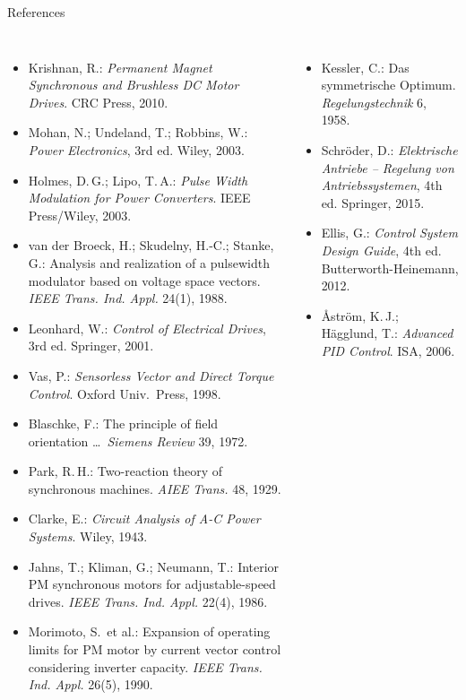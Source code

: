 \documentclass[aspectratio=169,10pt]{beamer}
\begin{document}
\begin{frame}[t]{References}
\fontsize{6}{7}\selectfont\setlength{\itemsep}{0pt}
\begin{columns}[T,onlytextwidth]
\begin{itemize}
\item Krishnan, R.: \emph{Permanent Magnet Synchronous and Brushless DC Motor Drives}. CRC Press, 2010.
\item Mohan, N.; Undeland, T.; Robbins, W.: \emph{Power Electronics}, 3rd ed. Wiley, 2003.
\item Holmes, D.\,G.; Lipo, T.\,A.: \emph{Pulse Width Modulation for Power Converters}. IEEE Press/Wiley, 2003.
\item van der Broeck, H.; Skudelny, H.-C.; Stanke, G.: Analysis and realization of a pulsewidth modulator based on voltage space vectors. \emph{IEEE Trans. Ind. Appl.} 24(1), 1988.
\item Leonhard, W.: \emph{Control of Electrical Drives}, 3rd ed. Springer, 2001.
\item Vas, P.: \emph{Sensorless Vector and Direct Torque Control}. Oxford Univ.\ Press, 1998.
\item Blaschke, F.: The principle of field orientation \ldots\ \emph{Siemens Review} 39, 1972.
\item Park, R.\,H.: Two-reaction theory of synchronous machines. \emph{AIEE Trans.} 48, 1929.
\item Clarke, E.: \emph{Circuit Analysis of A-C Power Systems}. Wiley, 1943.
\item Jahns, T.; Kliman, G.; Neumann, T.: Interior PM synchronous motors for adjustable-speed drives. \emph{IEEE Trans. Ind. Appl.} 22(4), 1986.
\item Morimoto, S.\ et al.: Expansion of operating limits for PM motor by current vector control considering inverter capacity. \emph{IEEE Trans. Ind. Appl.} 26(5), 1990.
\end{itemize}
\begin{itemize}
\item Kessler, C.: Das symmetrische Optimum. \emph{Regelungstechnik} 6, 1958.
\item Schröder, D.: \emph{Elektrische Antriebe -- Regelung von Antriebssystemen}, 4th ed. Springer, 2015.
\item Ellis, G.: \emph{Control System Design Guide}, 4th ed. Butterworth-Heinemann, 2012.
\item Åström, K.\,J.; Hägglund, T.: \emph{Advanced PID Control}. ISA, 2006.

\end{itemize}
\end{columns}
\end{frame}
\end{document}
